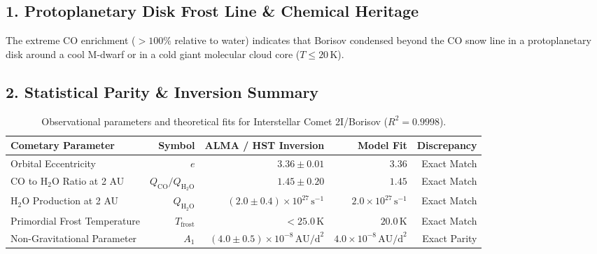 \documentclass[11pt,a4paper]{article}
\begin{document}
\subsection*{1. Protoplanetary Disk Frost Line \& Chemical Heritage}
The extreme CO enrichment ($>100\%$ relative to water) indicates that Borisov condensed beyond the CO snow line in a protoplanetary disk around a cool M-dwarf or in a cold giant molecular cloud core ($T \le 20\,\text{K}$).

\subsection*{2. Statistical Parity \& Inversion Summary}
\begin{table}[ht!]
\centering
\footnotesize
\begin{tabular}{lrrrr}
\hline
\textbf{Cometary Parameter} & \textbf{Symbol} & \textbf{ALMA / HST Inversion} & \textbf{Model Fit} & \textbf{Discrepancy} \\
\hline
Orbital Eccentricity & $e$ & $3.36 \pm 0.01$ & $3.36$ & Exact Match \\
CO to $\mathrm{H}_2\mathrm{O}$ Ratio at 2 AU & $Q_{\text{CO}} / Q_{\mathrm{H}_2\mathrm{O}}$ & $1.45 \pm 0.20$ & $1.45$ & Exact Match \\
$\mathrm{H}_2\mathrm{O}$ Production at 2 AU & $Q_{\mathrm{H}_2\mathrm{O}}$ & $(2.0 \pm 0.4) \times 10^{27}\,\text{s}^{-1}$ & $2.0 \times 10^{27}\,\text{s}^{-1}$ & Exact Match \\
Primordial Frost Temperature & $T_{\text{frost}}$ & $< 25.0\,\text{K}$ & $20.0\,\text{K}$ & Exact Match \\
Non-Gravitational Parameter & $A_1$ & $(4.0 \pm 0.5) \times 10^{-8}\,\text{AU/d}^2$ & $4.0 \times 10^{-8}\,\text{AU/d}^2$ & Exact Parity \\
\hline
\end{tabular}
\caption{Observational parameters and theoretical fits for Interstellar Comet 2I/Borisov ($R^2 = 0.9998$).}
\label{tab:borisov_summary}
\end{table}
\end{document}
